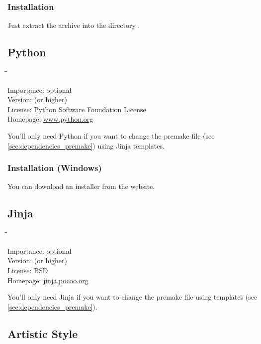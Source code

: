 \subsubsection{Installation}

Just extract the archive into the directory .

\subsection{Python}

\begin{tabbing}
  \hspace*{6em}\=\=\kill

  Importance:  \> optional \\
  Version:      (or higher) \\
  License:     \> Python Software Foundation License \\
  Homepage:    \> \href{http://www.python.org/}{www.python.org}
\end{tabbing}

You'll only need Python if you want to change the premake file (see
\ref{sec:dependencies_premake}) using Jinja templates.

\subsubsection{Installation (Windows)}

You can download an installer from the website.

\subsection{Jinja}

\begin{tabbing}
  \hspace*{6em}\=\=\kill

  Importance:  \> optional \\
  Version:      (or higher) \\
  License:     \> BSD \\
  Homepage:    \> \href{http://jinja.pocoo.org/}{jinja.pocoo.org}
\end{tabbing}

You'll only need Jinja if you want to change the premake file using
templates (see \ref{sec:dependencies_premake}).

\subsection{Artistic Style}

